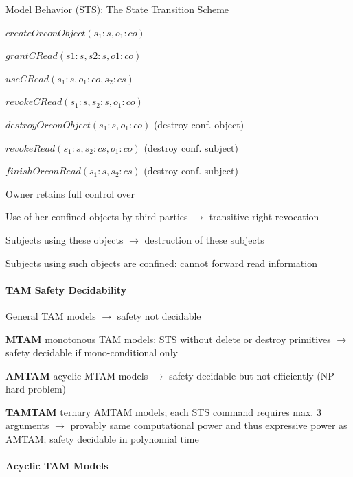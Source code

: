 \documentclass[a4paper]{article}
\begin{document}
\begin{multicols}{3}
    Model Behavior (STS): The State Transition Scheme
    \begin{itemize*}
        \item $createOrconObject(s_1:s, o_1:co)$
        \item $grantCRead(s 1 :s,s 2 :s,o 1 :co)$
        \item $useCRead(s_1:s, o_1:co, s_2:cs)$
        \item $revokeCRead(s_1:s, s_2:s, o_1:co)$
        \item $destroyOrconObject(s_1:s, o_1:co)$ (destroy conf. object)
        \item $revokeRead(s_1:s, s_2:cs, o_1:co)$ (destroy conf. subject)
        \item $finishOrconRead(s_1:s, s_2:cs)$ (destroy conf. subject)
        \item Owner retains full control over
        \item Use of her confined objects by third parties $\rightarrow$ transitive right revocation
        \item Subjects using these objects $\rightarrow$ destruction of these subjects
        \item Subjects using such objects are confined: cannot forward read information
    \end{itemize*}

    \paragraph{TAM Safety Decidability}
    \begin{itemize*}
        \item General TAM models $\rightarrow$ safety not decidable
        \item \textbf{MTAM} monotonous TAM models; STS without delete or destroy primitives $\rightarrow$ safety decidable if mono-conditional only
        \item \textbf{AMTAM} acyclic MTAM models $\rightarrow$ safety decidable but not efficiently (NP-hard problem)
        \item \textbf{TAMTAM} ternary AMTAM models; each STS command requires max. 3 arguments $\rightarrow$ provably same computational power and thus expressive power as AMTAM; safety decidable in polynomial time
    \end{itemize*}

    \paragraph{Acyclic TAM Models}


\end{multicols}
\end{document}
